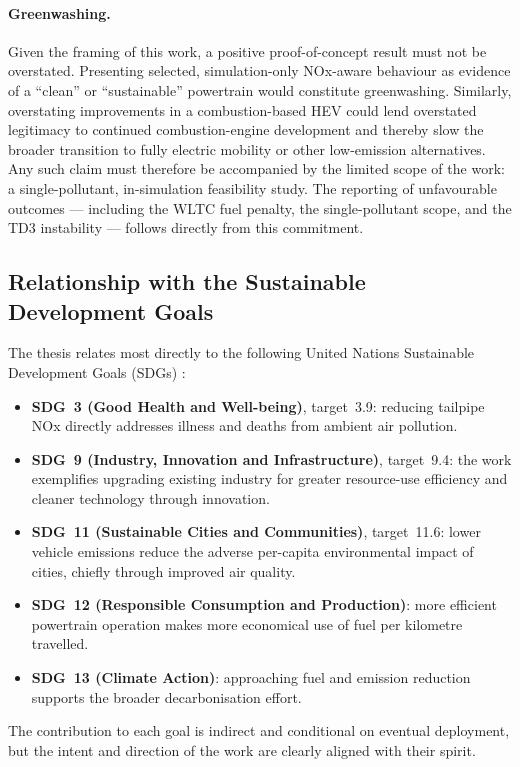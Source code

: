 \paragraph{Greenwashing.} Given the framing of this work, a positive proof-of-concept result must not be overstated. Presenting selected, simulation-only \ac{NOx}-aware behaviour as evidence of a ``clean'' or ``sustainable'' powertrain would constitute greenwashing. Similarly, overstating improvements in a combustion-based \ac{HEV} could lend overstated legitimacy to continued combustion-engine development and thereby slow the broader transition to fully electric mobility or other low-emission alternatives. Any such claim must therefore be accompanied by the limited scope of the work: a single-pollutant, in-simulation feasibility study. The reporting of unfavourable outcomes --- including the \ac{WLTC} fuel penalty, the single-pollutant scope, and the \ac{TD3} instability --- follows directly from this commitment.

\subsection{Relationship with the Sustainable Development Goals}

The thesis relates most directly to the following United Nations Sustainable Development Goals (SDGs) \cite{united_nations_17_nodate}:

\begin{itemize}
  \item \textbf{SDG~3 (Good Health and Well-being)}, target~3.9: reducing tailpipe \ac{NOx} directly addresses illness and deaths from ambient air pollution.
  \item \textbf{SDG~9 (Industry, Innovation and Infrastructure)}, target~9.4: the work exemplifies upgrading existing industry for greater resource-use efficiency and cleaner technology through innovation.
  \item \textbf{SDG~11 (Sustainable Cities and Communities)}, target~11.6: lower vehicle emissions reduce the adverse per-capita environmental impact of cities, chiefly through improved air quality.
  \item \textbf{SDG~12 (Responsible Consumption and Production)}: more efficient powertrain operation makes more economical use of fuel per kilometre travelled.
  \item \textbf{SDG~13 (Climate Action)}: approaching fuel and emission reduction supports the broader decarbonisation effort.
\end{itemize}

The contribution to each goal is indirect and conditional on eventual deployment, but the intent and direction of the work are clearly aligned with their spirit.
